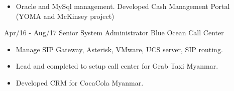 \documentclass[]{friggeri-cv}
\begin{document}
\begin{entrylist}
{\begin{itemize}
        \item Oracle and MySql management. Developed Cash Management Portal (YOMA and McKinsey project)
      \end{itemize}
    }
  \entry
    {Apr/16 - Aug/17}
    {Senior System Administrator}
    {Blue Ocean Call Center}
    {
      \begin{itemize}
        \item Manage SIP Gateway, Asterisk, VMware, UCS server, SIP routing.
        \item Lead and completed to setup call center for Grab Taxi Myanmar.
        \item Developed CRM for CocaCola Myanmar.
      \end{itemize}
      }
\end{entrylist}
\newpage
~
\end{document}
